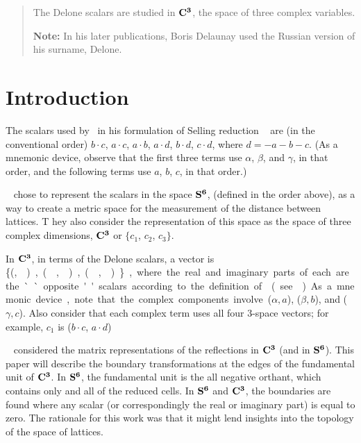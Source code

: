 \documentclass[]{iucr}              %
\numberwithin{equation}{section}
\newcommand{\SVI}[0]{$\bf{S^{6}}$}
\newcommand{\CIII}[0]{$\bf{C^{3}}$}
\begin{document}
	\newcommand{\ci}[0]{$c_1$}
	\newcommand{\cii}[0]{$c_2$}
	\newcommand{\ciii}[0]{$c_3$}
	
	
	\begin{abstract}
		
		The Delone scalars are studied in \CIII, the space of three complex variables.
		
		{\bf Note:}  In his later publications, Boris Delaunay used the Russian version of his surname, Delone.\\
		
		
	\end{abstract}
	
	
	\section{Introduction}
	
	The scalars used by~ in his formulation of Selling reduction ~\cite{Selling1874}
	are (in the conventional order) $b \cdot c$, $a \cdot c$, $a \cdot b$, $a \cdot d$, 
	$b \cdot d$, $c \cdot d$, where $d = -a-b-c$. 
	(As a mnemonic device, 
	observe that the first three terms use
	$\alpha$, $\beta$, and $\gamma$, 
	in that order, 
	and the following terms use $a$, $b$, $c$, in that order.)
	
	~ chose to 
	represent the scalars in the space \SVI{},
	\Svec{} (defined in the order above), 
	as a way to create a metric space
	for the measurement of the distance between lattices. T
	hey also consider the representation of this space as the
	space of three complex dimensions, \CIII{} or 
	{$\{c_1$}, {$c_2$}, {$c_3\}$}. 	
	
	In \CIII{}, in terms of the Delone scalars, 
	a vector is \{(\si,\siv ), (\sii,\sv),(\siii,\svi)\}, 
	where the real and imaginary parts
	of each are the ``opposite'' scalars 
	according to the definition of~ (see~).
	As a mnemonic device, 
	note that the complex components involve ($\alpha,a$), ($\beta, b$), and ($\gamma,c$).
	Also consider that each complex term uses all 
	four 3-space vectors; for example, $c_1$ is ($b \cdot c$, $a \cdot d$)
	
	~ considered the matrix representations 
	of the reflections in \CIII{} (and in \SVI{}). 
	This paper will describe the boundary transformations 
	at the edges of the fundamental	unit of \CIII{}. 
	In \SVI{}, the fundamental unit is the all negative orthant, 
	which contains only and	all of the reduced cells. 
	In \SVI{} and \CIII{}, 
	the boundaries are found where any scalar 
	(or correspondingly the real or imaginary part) 
	is equal to zero. The rationale for this work was 
	that it might lend insights into the topology of
	the space of lattices. 
	
\end{document}
